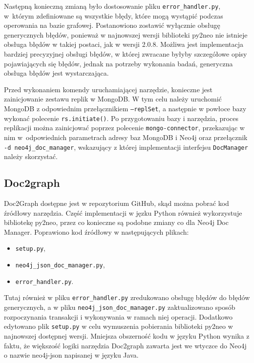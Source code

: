 \documentclass[a4paper,twoside,12pt]{book}
\begin{document}
Następną konieczną zmianą było dostosowanie pliku \lstinline{error_handler.py}, w~którym zdefiniowane są wszystkie błędy, które mogą wystąpić podczas operowania na bazie grafowej. Postanowiono zostawić wyłącznie obsługę generycznych błędów, ponieważ w najnowszej wersji biblioteki py2neo nie istnieje obsługa błędów w takiej postaci, jak w wersji 2.0.8. Możliwa jest implementacja bardziej precyzyjnej obsługi błędów, w której zwracane byłyby szczegółowe opisy pojawiających się błędów, jednak na potrzeby wykonania badań, generyczna obsługa błędów jest wystarczająca.

Przed wykonaniem komendy uruchamiającej narzędzie, konieczne jest zainicjowanie zestawu replik w MongoDB. W tym celu należy uruchomić MongoDB z odpowiednim przełącznikiem \texttt{--replSet}, a następnie w powłoce bazy wykonać polecenie \texttt{rs.initiate()}. Po przygotowaniu bazy i narzędzia, proces replikacji można zainicjować poprzez polecenie \texttt{mongo-connector}, przekazując w nim w~odpowiednich parametrach adresy baz MongoDB i Neo4j oraz przełącznik \texttt{-d neo4j\_doc\_manager}, wskazujący z której implementacji interfejsu \texttt{DocManager} należy skorzystać.

\subsection{Doc2graph}

Doc2Graph dostępne jest w repozytorium GitHub, skąd można pobrać kod źródłowy narzędzia. Część implementacji w jęzku Python również wykorzystuje bibliotekę py2neo, przez co konieczne są podobne zmiany co dla Neo4j Doc Manager. Poprawiono kod źródłowy w następujących plikach:

\begin{itemize}
\item \texttt{setup.py},
\item \texttt{neo4j\_json\_doc\_manager.py},
\item \texttt{error\_handler.py}.
\end{itemize}

Tutaj również w pliku \texttt{error\_handler.py} zredukowano obsługę błędów do błędów generycznych, a w pliku \texttt{neo4j\_json\_doc\_manager.py} zaktualizowano sposób rozpoczynania transakcji i wykonywania w ramach niej operacji. Dodatkowo edytowano plik \texttt{setup.py} w celu wymuszenia pobierania biblioteki py2neo w najnowszej dostępnej wersji. Mniejsza obszerność kodu w języku Python wynika z faktu, że większość logiki narzędzia Doc2graph zawarta jest we wtyczce do Neo4j o nazwie neo4j-json napisanej w języku Java.
\end{document}
